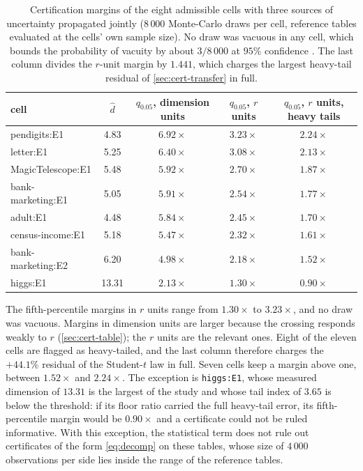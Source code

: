 \documentclass[twoside,11pt]{article}
\theoremstyle{plain}
\theoremstyle{definition}
\theoremstyle{remark}
\newcommand{\dhat}{\ensuremath{\hat{d}}}
\begin{document}
\begin{table}[htbp]
\centering
\small
\begin{tabular}{lcccc}
\toprule
cell & $\dhat$ & $q_{0.05}$, dimension units & $q_{0.05}$, $r$ units & $q_{0.05}$, $r$ units, heavy tails \\
\midrule
pendigits:E1       & 4.83 & $6.92\times$ & $3.23\times$ & $2.24\times$ \\
letter:E1          & 5.25 & $6.40\times$ & $3.08\times$ & $2.13\times$ \\
MagicTelescope:E1  & 5.48 & $5.92\times$ & $2.70\times$ & $1.87\times$ \\
bank-marketing:E1  & 5.05 & $5.91\times$ & $2.54\times$ & $1.77\times$ \\
adult:E1           & 4.48 & $5.84\times$ & $2.45\times$ & $1.70\times$ \\
census-income:E1   & 5.18 & $5.47\times$ & $2.32\times$ & $1.61\times$ \\
bank-marketing:E2  & 6.20 & $4.98\times$ & $2.18\times$ & $1.52\times$ \\
higgs:E1           & 13.31 & $2.13\times$ & $1.30\times$ & $0.90\times$ \\
\bottomrule
\end{tabular}
\caption{Certification margins of the eight admissible cells with three
sources of uncertainty propagated jointly ($8\,000$ Monte-Carlo draws per
cell, reference tables evaluated at the cells' own sample size). No draw
was vacuous in any cell, which bounds the probability of vacuity by about
$3/8\,000$ at $95\%$ confidence \citep{hanley1983}. The last column divides the $r$-unit margin by $1.441$, which
charges the largest heavy-tail residual of \cref{sec:cert-transfer} in
full.}\label{tab:margins}
\end{table}

The fifth-percentile margins in $r$ units range from $1.30\times$ to
$3.23\times$, and no draw was vacuous. Margins in dimension units are larger
because the crossing responds weakly to $r$ (\cref{sec:cert-table}); the
$r$ units are the relevant ones. Eight of the eleven cells are flagged as
heavy-tailed, and the last column therefore charges the $+44.1\%$ residual
of the Student-$t$ law in full. Seven cells keep a margin above one, between
$1.52\times$ and $2.24\times$. The exception is \texttt{higgs:E1}, whose
measured dimension of $13.31$ is the largest of the study and whose tail
index of $3.65$ is below the threshold: if its floor ratio carried the full
heavy-tail error, its fifth-percentile margin would be $0.90\times$ and a
certificate could not be ruled informative. With this exception, the
statistical term does not rule out certificates of the form
\cref{eq:decomp} on these tables, whose size of $4\,000$ observations per
side lies inside the range of the reference tables.
\end{document}
